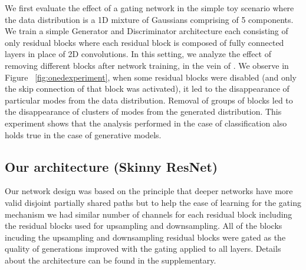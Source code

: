 We first evaluate the effect of a gating network in the simple toy scenario where the data distribution is a 1D mixture of Gaussians comprising of 5 components.
We train a simple Generator and Discriminator architecture each consisting of only residual blocks where each residual block is composed of fully connected layers in place of 2D convolutions.
In this setting, we analyze the effect of removing different blocks after network training, in the vein of \cite{veit2016residual}.
We observe in Figure ~\ref{fig:onedexperiment}, when some residual blocks were disabled (and only the skip connection of that block was activated), it led to the disappearance of particular modes from the data distribution. 
Removal of groups of blocks led to the disappearance of clusters of modes from the generated distribution. 
This experiment shows that the analysis performed in the case of classification \cite{veit2016residual} also holds true in the case of generative models.




\subsection{Our architecture (Skinny ResNet)}
Our network design was based on the principle that deeper networks have more valid disjoint partially shared paths but to help the ease of learning for the gating mechanism we had similar number of channels for each residual block including the residual blocks used for upsampling and downsampling. All of the blocks incuding the upsampling and downsampling residual blocks were gated as the quality of generations improved with the gating applied to all layers. Details about the architecture can be found in the supplementary.

